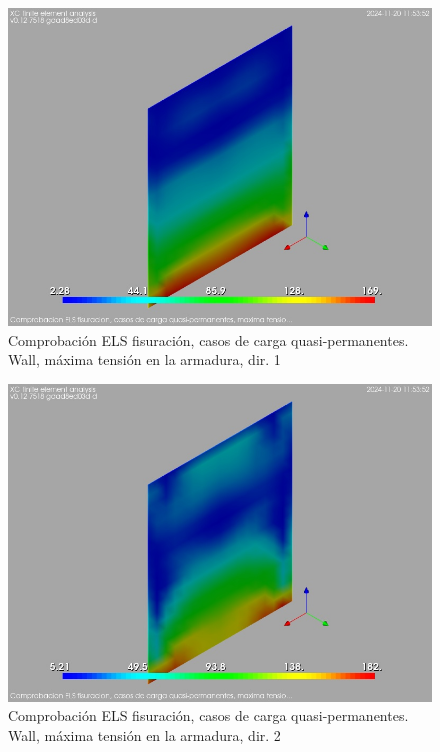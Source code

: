 \begin{figure}[ht]
\begin{center}
\includegraphics[width=\linewidth]{results/graphics/crackingSLS_qperm/wallsigma_sSect1}
\caption{Comprobación ELS fisuración, casos de carga quasi-permanentes. Wall, máxima tensión en la armadura, dir. 1}
\label{SLS_quasiPermanentLoadsCrackControlwallsigma_sSect1}
\end{center}
\end{figure}
\begin{figure}[ht]
\begin{center}
\includegraphics[width=\linewidth]{results/graphics/crackingSLS_qperm/wallsigma_sSect2}
\caption{Comprobación ELS fisuración, casos de carga quasi-permanentes. Wall, máxima tensión en la armadura, dir. 2}
\label{SLS_quasiPermanentLoadsCrackControlwallsigma_sSect2}
\end{center}
\end{figure}
